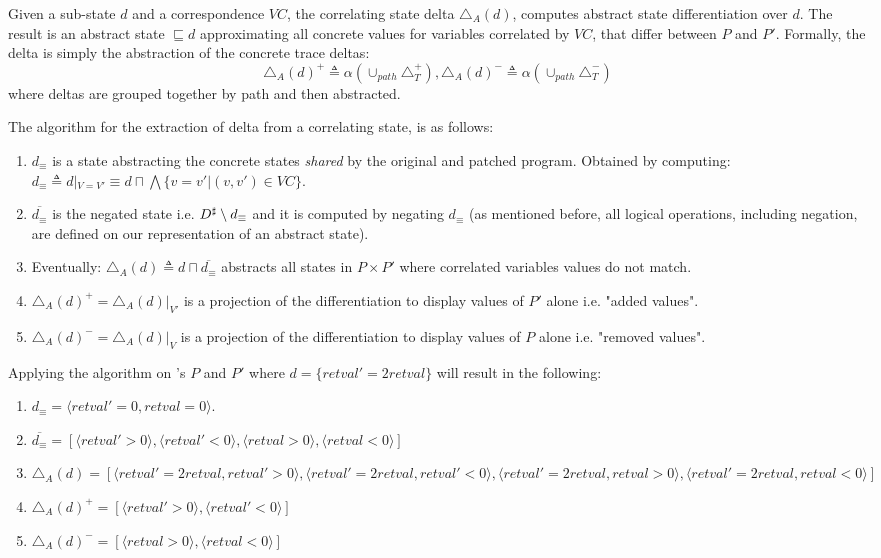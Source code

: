 \begin{definition}  
Given a sub-state $d$ and a correspondence $VC$, the correlating state delta $\triangle_{A}(d)$, computes abstract state differentiation over $d$. The result is an abstract state $\sqsubseteq d$ approximating all concrete values for variables correlated by $VC$, that differ between $P$ and $P'$. Formally, the delta is simply the abstraction of the concrete trace deltas:
\[
\triangle_{A}(d)^{+} \triangleq \alpha(\cup_{path}\triangle_{T}^{+}) ,
\triangle_{A}(d)^{-} \triangleq \alpha(\cup_{path}\triangle_{T}^{-})
\]
where deltas are grouped together by path and then abstracted.
\end{definition}
The algorithm for the extraction of delta from a correlating state, is as follows:
\begin{enumerate}
\item $d_{\equiv}$ is a state abstracting the concrete states \emph{shared} by the original and patched program. Obtained by computing: $d_{\equiv} \triangleq d|_{V=V'} \equiv d \sqcap \bigwedge\{ v = v' | (v,v') \in VC \}$.
\item $\overline{d_{\equiv}}$ is the negated state i.e. $D^\sharp \setminus d_{\equiv}$ and it is computed by negating $d_{\equiv}$ (as mentioned before, all logical operations, including negation, are defined on our representation of an abstract state).
\item Eventually: $\triangle_{A}(d) \triangleq d \sqcap \overline{d_{\equiv}}$ abstracts all states in $P \times P'$ where correlated variables values do not match.
\item $\triangle_{A}(d)^{+} = \triangle_{A}(d)|_{V'}$ is a projection of the differentiation to display values of $P'$ alone i.e. "added values".
\item $\triangle_{A}(d)^{-} = \triangle_{A}(d)|_{V}$ is a projection of the differentiation to display values of $P$ alone i.e. "removed values".
\end{enumerate}
\begin{Example}
Applying the algorithm on 's $P$ and $P'$ where $d = \{ retval' = 2retval \}$ will result in the following:
\begin{enumerate}
\item $d_{\equiv} = \langle retval' = 0, retval = 0 \rangle$.
\item $\overline{d_{\equiv}} = [ \langle retval' > 0 \rangle, \langle retval' < 0 \rangle, \langle retval > 0 \rangle, \langle retval < 0 \rangle ]$
\item $\triangle_{A}(d)  = [ \langle retval' = 2retval, retval' > 0 \rangle, \langle retval' = 2retval, retval' < 0 \rangle, \langle retval' = 2retval, retval > 0 \rangle, \langle retval' = 2retval, retval < 0 \rangle ]$
\item $\triangle_{A}(d)^{+} = [ \langle retval' > 0 \rangle, \langle retval' < 0 \rangle ]$
\item $\triangle_{A}(d)^{-} = [\langle retval > 0 \rangle, \langle retval < 0 \rangle]$
\end{enumerate}
\end{Example}
